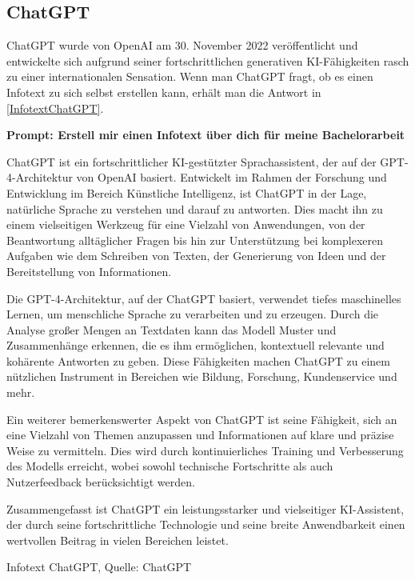 \subsection{ChatGPT}  \label{ChatGPT}


ChatGPT wurde von OpenAI am 30. November 2022 veröffentlicht und entwickelte sich aufgrund seiner fortschrittlichen 
generativen KI-Fähigkeiten rasch zu einer internationalen Sensation. Wenn man ChatGPT fragt, ob es einen Infotext 
zu sich selbst erstellen kann, erhält man die Antwort in \autoref{InfotextChatGPT}.

\begin{prompt} 
    \begin{tcolorbox}[colback=gray!20, colframe=gray!20, boxrule=0pt, sharp corners] 
    \textbf{Prompt: Erstell mir einen Infotext über dich für meine Bachelorarbeit}

    ChatGPT ist ein fortschrittlicher KI-gestützter Sprachassistent, der auf der GPT-4-Architektur von OpenAI basiert. 
    Entwickelt im Rahmen der Forschung und Entwicklung im Bereich Künstliche Intelligenz, ist ChatGPT in der Lage, 
    natürliche Sprache zu verstehen und darauf zu antworten. Dies macht ihn zu einem vielseitigen Werkzeug für eine 
    Vielzahl von Anwendungen, von der Beantwortung alltäglicher Fragen bis hin zur Unterstützung bei komplexeren 
    Aufgaben wie dem Schreiben von Texten, der Generierung von Ideen und der Bereitstellung von Informationen.
    
    Die GPT-4-Architektur, auf der ChatGPT basiert, verwendet tiefes maschinelles Lernen, um menschliche Sprache zu 
    verarbeiten und zu erzeugen. Durch die Analyse großer Mengen an Textdaten kann das Modell Muster und Zusammenhänge 
    erkennen, die es ihm ermöglichen, kontextuell relevante und kohärente Antworten zu geben. Diese Fähigkeiten machen 
    ChatGPT zu einem nützlichen Instrument in Bereichen wie Bildung, Forschung, Kundenservice und mehr.
    
    Ein weiterer bemerkenswerter Aspekt von ChatGPT ist seine Fähigkeit, sich an eine Vielzahl von Themen anzupassen 
    und Informationen auf klare und präzise Weise zu vermitteln. Dies wird durch kontinuierliches Training und 
    Verbesserung des Modells erreicht, wobei sowohl technische Fortschritte als auch Nutzerfeedback berücksichtigt 
    werden.
    
    Zusammengefasst ist ChatGPT ein leistungsstarker und vielseitiger KI-Assistent, der durch seine fortschrittliche 
    Technologie und seine breite Anwendbarkeit einen wertvollen Beitrag in vielen Bereichen leistet.
    \vfill
    \end{tcolorbox}
    \caption{Infotext ChatGPT, Quelle: ChatGPT}
    \label{InfotextChatGPT}
\end{prompt}

